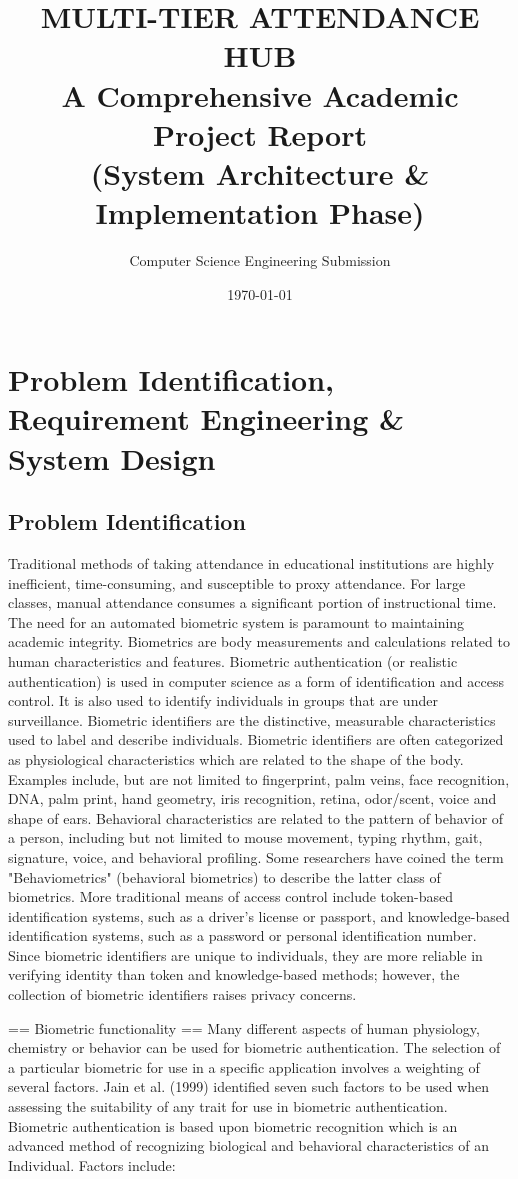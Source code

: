 \documentclass[12pt,a4paper]{report}
\title{
    \vspace{2cm}
    \Huge \textbf{MULTI-TIER ATTENDANCE HUB} \\
    \vspace{1cm}
    \Large A Comprehensive Academic Project Report \\
    \vspace{0.5cm}
    \large (System Architecture \& Implementation Phase)
}
\author{Computer Science Engineering Submission}
\date{\today}
\begin{document}
\maketitle
\tableofcontents
\newpage

\chapter{Problem Identification, Requirement Engineering \& System Design}

\section{Problem Identification}
Traditional methods of taking attendance in educational institutions are highly inefficient, time-consuming, and susceptible to proxy attendance. For large classes, manual attendance consumes a significant portion of instructional time. The need for an automated biometric system is paramount to maintaining academic integrity.
Biometrics are body measurements and calculations related to human characteristics and features. Biometric authentication (or realistic authentication) is used in computer science as a form of identification and access control. It is also used to identify individuals in groups that are under surveillance.
Biometric identifiers are the distinctive, measurable characteristics used to label and describe individuals. Biometric identifiers are often categorized as physiological characteristics which are related to the shape of the body. Examples include, but are not limited to fingerprint, palm veins, face recognition, DNA, palm print, hand geometry, iris recognition, retina, odor/scent, voice and shape of ears. Behavioral characteristics are related to the pattern of behavior of a person, including but not limited to mouse movement, typing rhythm, gait, signature, voice, and behavioral profiling. Some researchers have coined the term "Behaviometrics" (behavioral biometrics) to describe the latter class of biometrics.
More traditional means of access control include token-based identification systems, such as a driver's license or passport, and knowledge-based identification systems, such as a password or personal identification number. Since biometric identifiers are unique to individuals, they are more reliable in verifying identity than token and knowledge-based methods; however, the collection of biometric identifiers raises privacy concerns. 


== Biometric functionality ==
Many different aspects of human physiology, chemistry or behavior can be used for biometric authentication. The selection of a particular biometric for use in a specific application involves a weighting of several factors. Jain et al. (1999) identified seven such factors to be used when assessing the suitability of any trait for use in biometric authentication. Biometric authentication is based upon biometric recognition which is an advanced method of recognizing biological and behavioral characteristics of an Individual.
Factors include:
\end{document}
